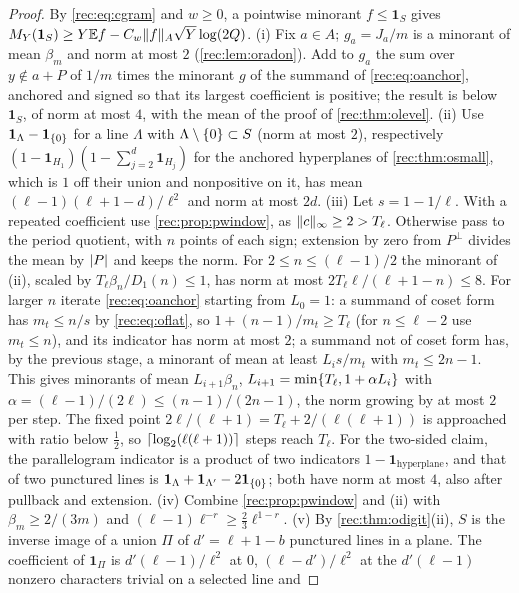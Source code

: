 \begin{proof}
By \eqref{rec:eq:cgram} and $w\ge0$, a pointwise minorant $f\le\mathbf 1_S$ gives $M_Y(\mathbf 1_S)\ge Y\mathbb Ef-C_w\lVert f\rVert_A\sqrt Y\log(2Q)$.
(i) Fix $a\in A$; $g_a=J_a/m$ is a minorant of mean $\beta_m$ and norm at most $2$ (\cref{rec:lem:oradon}). Add to $g_a$ the sum over $y\notin a+P$ of $1/m$ times the
minorant $g$ of the summand of \eqref{rec:eq:oanchor}, anchored and signed so that its largest coefficient is positive;
the result is below $\mathbf 1_S$, of norm at most $4$, with the mean of the proof of \cref{rec:thm:olevel}.
(ii) Use $\mathbf 1_\Lambda-\mathbf 1_{\{0\}}$ for a line $\Lambda$ with $\Lambda\setminus\{0\}\subset S$ (norm at most $2$), respectively
$(1-\mathbf 1_{H_1})(1-\sum_{j=2}^d\mathbf 1_{H_j})$ for the anchored hyperplanes of \cref{rec:thm:osmall}, which is $1$ off their union and
nonpositive on it, has mean $(\ell-1)(\ell+1-d)/\ell^2$ and norm at most $2d$.
(iii) Let $s=1-1/\ell$. With a repeated coefficient use \cref{rec:prop:pwindow}, as $\lVert c\rVert_\infty\ge2>T_\ell$. Otherwise pass to the period quotient, with $n$ points of
each sign; extension by zero from $P^\perp$ divides the mean by $\lvert P\rvert$ and keeps the norm. For $2\le n\le(\ell-1)/2$ the
minorant of (ii), scaled by $T_\ell\beta_n/D_1(n)\le1$, has norm at most $2T_\ell\ell/(\ell+1-n)\le8$. For larger $n$ iterate
\eqref{rec:eq:oanchor} starting from $L_0=1$: a summand of coset form has $m_t\le n/s$ by \eqref{rec:eq:oflat}, so $1+(n-1)/m_t\ge T_\ell$
(for $n\le\ell-2$ use $m_t\le n$), and its indicator has norm at most $2$; a summand not of coset form has, by the
previous stage, a minorant of mean at least $L_is/m_t$ with $m_t\le2n-1$. This gives minorants of mean
$L_{i+1}\beta_n$, $L_{i+1}=\min\{T_\ell,1+\alpha L_i\}$ with $\alpha=(\ell-1)/(2\ell)\le(n-1)/(2n-1)$, the norm growing by at most $2$ per step.
The fixed point $2\ell/(\ell+1)=T_\ell+2/(\ell(\ell+1))$ is approached with ratio below $\tfrac12$, so $\lceil\log_2(\ell(\ell+1))\rceil$ steps reach $T_\ell$.
For the two-sided claim, the parallelogram indicator is a product of two indicators $1-\mathbf 1_{\text{hyperplane}}$, and that
of two punctured lines is $\mathbf 1_\Lambda+\mathbf 1_{\Lambda'}-2\mathbf 1_{\{0\}}$; both have norm at most $4$, also after pullback and extension.
(iv) Combine \cref{rec:prop:pwindow} and (ii) with $\beta_m\ge2/(3m)$ and $(\ell-1)\ell^{-r}\ge\tfrac23\ell^{1-r}$.
(v) By \cref{rec:thm:odigit}(ii), $S$ is the inverse image of a union $\Pi$ of $d'=\ell+1-b$ punctured lines in a plane. The
coefficient of $\mathbf 1_\Pi$ is $d'(\ell-1)/\ell^2$ at $0$, $(\ell-d')/\ell^2$ at the $d'(\ell-1)$ nonzero characters trivial on a selected line and

\end{proof}
